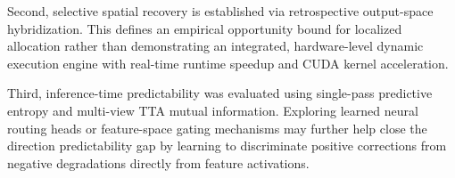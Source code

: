 Second, selective spatial recovery is established via retrospective output-space hybridization. This defines an empirical opportunity bound for localized allocation rather than demonstrating an integrated, hardware-level dynamic execution engine with real-time runtime speedup and CUDA kernel acceleration.

Third, inference-time predictability was evaluated using single-pass predictive entropy and multi-view TTA mutual information. Exploring learned neural routing heads or feature-space gating mechanisms may further help close the direction predictability gap by learning to discriminate positive corrections from negative degradations directly from feature activations.
